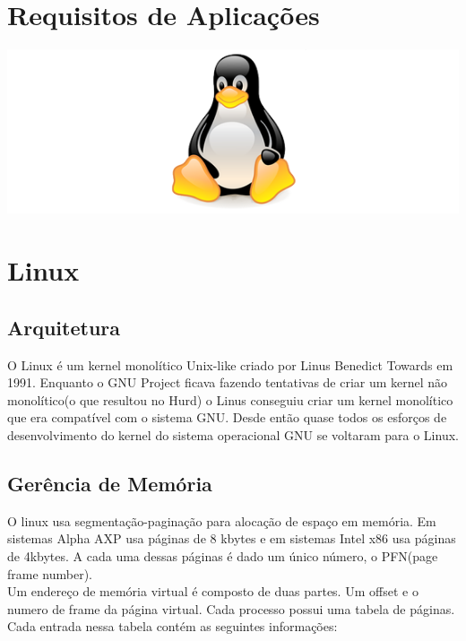 \documentclass[conference]{IEEEtran}
\begin{document}
\section{Requisitos de Aplicações}\label{sec:req}

\includegraphics[scale = 0.4]{Tux.png}\\
\section{Linux}\label{sec:linux}

\subsection{Arquitetura}\label{sec:LinuxArq}
O Linux é um kernel monolítico Unix-like criado por Linus Benedict Towards em 1991.\cite{LinuxHistory} Enquanto o GNU Project ficava fazendo tentativas de criar um kernel não monolítico(o que resultou no Hurd) o Linus conseguiu criar um kernel monolítico que era compatível com o sistema GNU. Desde então quase todos os esforços de desenvolvimento do kernel do sistema operacional GNU se voltaram para o Linux.\\

\subsection{Gerência de Memória}\label{sec:LinuxMem}

O linux usa segmentação-paginação para alocação de espaço em memória. Em sistemas Alpha AXP usa páginas de 8 kbytes e em sistemas Intel x86 usa páginas de 4kbytes. A cada uma dessas páginas é dado um único número, o PFN(page frame number)\cite{GerenciaMemLinux}.\\

Um endereço de memória virtual é composto de duas partes. Um offset e o numero de frame da página virtual. Cada processo possui uma tabela de páginas. Cada entrada nessa tabela contém as seguintes informações:\\
\end{document}
